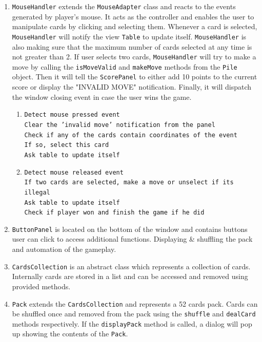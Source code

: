 \documentclass[a4paper, 11pt, titlepage]{article}
\begin{document}
\begin{enumerate}
	\item \texttt{MouseHandler} extends the \texttt{MouseAdapter} class and reacts to
		the events generated by player's mouse. It acts as the controller and enables the 
		user to manipulate cards by clicking and selecting them. Whenever a card is 
		selected, \texttt{MouseHandler} will notify the view \texttt{Table} to update 
		itself. \texttt{MouseHandler} is also making sure that the maximum number of 
		cards selected at any time is not greater than 2. If user selects two cards, 
		\texttt{MouseHandler} will try to make a move by calling the \texttt{isMoveValid}
		 and \texttt{makeMove} methods from the \texttt{Pile} object. Then it will 
		 tell the \texttt{ScorePanel} to either add 10 points to the current score or
		 display the "INVALID MOVE" notification. Finally, it will dispatch the window 
		 closing event in case the user wins the game.
		 \begin{enumerate}
			 \item \texttt{Detect mouse pressed event\\
				Clear the 'invalid move' notification from the panel\\
				Check if any of the cards contain coordinates of the event\\
				If so, select this card\\
				Ask table to update itself
				}
			\item \texttt{Detect mouse released event\\
				If two cards are selected, make a move or unselect if its illegal\\
				Ask table to update itself\\
				Check if player won and finish the game if he did
				}
		\end{enumerate} 
		
	\item \texttt{ButtonPanel} is located on the bottom of the window and contains
		buttons user can click to access additional functions. Displaying
		\& shuffling the pack and automation of the gameplay. 
		
	\item \texttt{CardsCollection} is an abstract class which represents a collection of 
		cards. Internally cards are stored in a list and can be accessed and removed 
		using provided methods.
		
	\item \texttt{Pack} extends the \texttt{CardsCollection} and represents a 52 cards 
		pack. Cards can be shuffled once and removed from the pack using the 
		\texttt{shuffle} and \texttt{dealCard} methods respectively. If the 
		\texttt{displayPack} method is called, a dialog will pop up showing the contents 
		of the \texttt{Pack}.
	

\end{enumerate}
\end{document}

